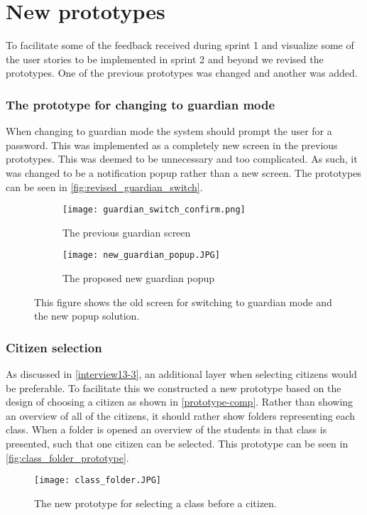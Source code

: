 \section{New prototypes}
To facilitate some of the feedback received during sprint 1 and visualize some of the user stories to be implemented in sprint 2 and beyond we revised the prototypes.
One of the previous prototypes was changed and another was added.

\subsubsection{The prototype for changing to guardian mode}
When changing to guardian mode the system should prompt the user for a password.
This was implemented as a completely new screen in the previous prototypes.
This was deemed to be unnecessary and too complicated.
As such, it was changed to be a notification popup rather than a new screen.
The prototypes can be seen in \autoref{fig:revised_guardian_switch}.

\begin{figure}[H]
    \begin{subfigure}{0.5\textwidth}
    \texttt{[image: guardian\_switch\_confirm.png]} 
    \caption{The previous guardian screen}
    \label{fig:previous_guardian_screen}
    \end{subfigure}
    \begin{subfigure}{0.5\textwidth}
        \texttt{[image: new\_guardian\_popup.JPG]}
    \caption{The proposed new guardian popup}
    \label{fig:new_guardian_popup}
    \end{subfigure} 
    \caption{This figure shows the old screen for switching to guardian mode and the new popup solution.}
    \label{fig:revised_guardian_switch}
\end{figure}

\subsubsection{Citizen selection}
As discussed in \autoref{interview13-3}, an additional layer when selecting citizens would be preferable.
To facilitate this we constructed a new prototype based on the design of choosing a citizen as shown in \autoref{prototype-comp}.
Rather than showing an overview of all of the citizens, it should rather show folders representing each class.
When a folder is opened an overview of the students in that class is presented, such that one citizen can be selected.
This prototype can be seen in \autoref{fig:class_folder_prototype}.

\begin{figure}[h]
    \centering
    \texttt{[image: class\_folder.JPG]}
    \caption{The new prototype for selecting a class before a citizen.}
    \label{fig:class_folder_prototype}
  \end{figure}
